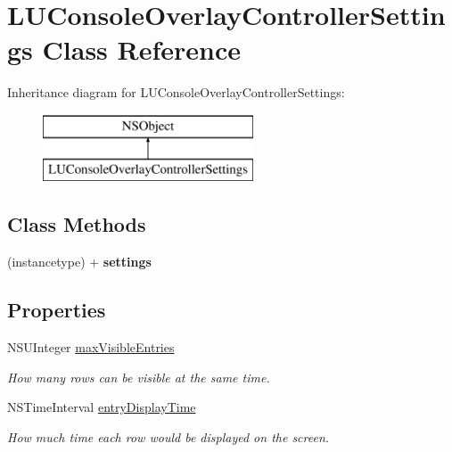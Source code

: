 \hypertarget{interface_l_u_console_overlay_controller_settings}{}\section{L\+U\+Console\+Overlay\+Controller\+Settings Class Reference}
\label{interface_l_u_console_overlay_controller_settings}
Inheritance diagram for L\+U\+Console\+Overlay\+Controller\+Settings\+:\begin{figure}[H]
\begin{center}
\leavevmode
\includegraphics[height=2.000000cm]{interface_l_u_console_overlay_controller_settings}
\end{center}
\end{figure}
\subsection*{Class Methods}
\begin{DoxyCompactItemize}
\item 
\mbox{\label{interface_l_u_console_overlay_controller_settings_afcb498d0efdad159d6782bcb3712a591}} 
(instancetype) + {\bfseries settings}
\end{DoxyCompactItemize}
\subsection*{Properties}
\begin{DoxyCompactItemize}
\item 
\mbox{\label{interface_l_u_console_overlay_controller_settings_ab7165c6b8903c9039b503d73bf190176}} 
N\+S\+U\+Integer \mbox{\hyperlink{interface_l_u_console_overlay_controller_settings_ab7165c6b8903c9039b503d73bf190176}{max\+Visible\+Entries}}
\begin{DoxyCompactList}\small\item\em How many rows can be visible at the same time. \end{DoxyCompactList}\item 
\mbox{\label{interface_l_u_console_overlay_controller_settings_a826901c740b9851a2b0f182406a00e82}} 
N\+S\+Time\+Interval \mbox{\hyperlink{interface_l_u_console_overlay_controller_settings_a826901c740b9851a2b0f182406a00e82}{entry\+Display\+Time}}
\begin{DoxyCompactList}\small\item\em How much time each row would be displayed on the screen. \end{DoxyCompactList}\end{DoxyCompactItemize}



